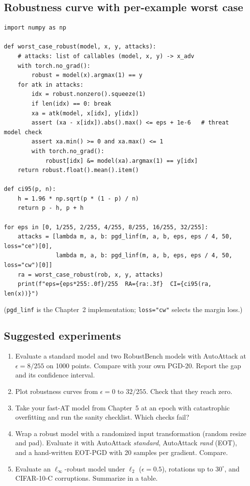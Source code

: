 \documentclass[10pt,a4paper]{extarticle}
\theoremstyle{definition}
\begin{document}
\subsection{Robustness curve with per-example worst case}

\begin{lstlisting}
import numpy as np

def worst_case_robust(model, x, y, attacks):
    # attacks: list of callables (model, x, y) -> x_adv
    with torch.no_grad():
        robust = model(x).argmax(1) == y
    for atk in attacks:
        idx = robust.nonzero().squeeze(1)
        if len(idx) == 0: break
        xa = atk(model, x[idx], y[idx])
        assert (xa - x[idx]).abs().max() <= eps + 1e-6   # threat model check
        assert xa.min() >= 0 and xa.max() <= 1
        with torch.no_grad():
            robust[idx] &= model(xa).argmax(1) == y[idx]
    return robust.float().mean().item()

def ci95(p, n):
    h = 1.96 * np.sqrt(p * (1 - p) / n)
    return p - h, p + h

for eps in [0, 1/255, 2/255, 4/255, 8/255, 16/255, 32/255]:
    attacks = [lambda m, a, b: pgd_linf(m, a, b, eps, eps / 4, 50, loss="ce")[0],
               lambda m, a, b: pgd_linf(m, a, b, eps, eps / 4, 50, loss="cw")[0]]
    ra = worst_case_robust(rob, x, y, attacks)
    print(f"eps={eps*255:.0f}/255  RA={ra:.3f}  CI={ci95(ra, len(x))}")
\end{lstlisting}

(\texttt{pgd\_linf} is the Chapter~2 implementation; \texttt{loss="cw"} selects the margin loss.)

\subsection{Suggested experiments}

\begin{enumerate}[label=\textbf{\arabic*.}]
  \item Evaluate a standard model and two RobustBench models with AutoAttack at \(\epsilon=8/255\) on 1000 points. Compare with your own PGD-20. Report the gap and its confidence interval.
  \item Plot robustness curves from \(\epsilon=0\) to \(32/255\). Check that they reach zero.
  \item Take your fast-AT model from Chapter~5 at an epoch with catastrophic overfitting and run the sanity checklist. Which checks fail?
  \item Wrap a robust model with a randomized input transformation (random resize and pad). Evaluate it with AutoAttack \emph{standard}, AutoAttack \emph{rand} (EOT), and a hand-written EOT-PGD with 20 samples per gradient. Compare.
  \item Evaluate an \(\ell_\infty\)-robust model under \(\ell_2\) (\(\epsilon=0.5\)), rotations up to \(30^\circ\), and CIFAR-10-C corruptions. Summarize in a table.
\end{enumerate}
\end{document}
